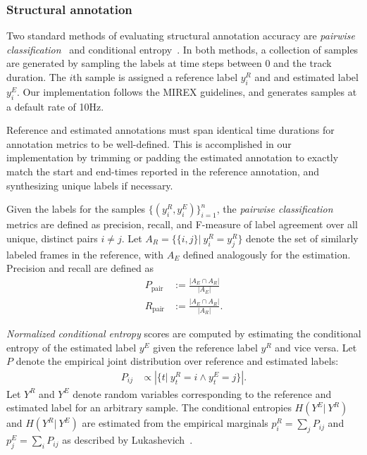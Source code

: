 \documentclass{article}
\def\given{\ensuremath{|~}}
\def\defeq{\ensuremath{:=}}
\begin{document}
\subsubsection{Structural annotation}
Two standard methods of evaluating structural annotation accuracy are \emph{pairwise classification}~\cite{levy2008structural}
and conditional entropy~\cite{lukashevich2008towards}.  In both methods, a collection of samples are generated by sampling the
labels at time steps between $0$ and the track duration.  The $i$th sample is assigned a reference label $y_i^R$ and
and estimated label $y_i^E$.  Our implementation follows the MIREX guidelines, and generates samples at a default rate of 10Hz.

Reference and estimated annotations must span identical time durations for annotation metrics to be well-defined.
This is accomplished in our implementation by trimming or padding the estimated annotation to exactly match the start and end-times
reported in the reference annotation, and synthesizing unique labels if necessary.

Given the labels for the samples $\{(y_i^R, y_i^E)\}_{i=1}^n$, the \emph{pairwise classification} metrics are defined as precision,
recall, and F-measure of label agreement over all unique, distinct pairs $i \neq j$.  
Let $A_R = \{ \{i, j\} \given y_i^R = y_j^R\}$ denote the set of similarly labeled frames in the reference, with $A_E$ defined
analogously for the estimation.  Precision and recall are defined as
\begin{align}
P_\text{pair} &\defeq \frac{ |A_E \cap A_R| }{ |A_E| }\\
R_\text{pair} &\defeq \frac{ |A_E \cap A_R| }{ |A_R| }.
\end{align}

\emph{Normalized conditional entropy} scores are computed by estimating the conditional entropy of the estimated label $y^E$ given
the reference label $y^R$ and vice versa.  Let $P$ denote the empirical joint distribution over reference and estimated labels:
\begin{align}
P_{ij} &\propto \left|\{t \given y_t^R = i \wedge y_t^E = j\}\right|.
\end{align}
Let $Y^R$ and $Y^E$ denote random variables corresponding to the reference and estimated label for an arbitrary sample.
The conditional entropies $H\left(Y^E \given Y^R\right)$ and $H\left(Y^R \given Y^E\right)$ are estimated from the 
empirical marginals ${p_i^R = \sum_j P_{ij}}$ and ${p_j^E = \sum_i P_{ij}}$ as described by 
Lukashevich~\cite{lukashevich2008towards}.
\end{document}
